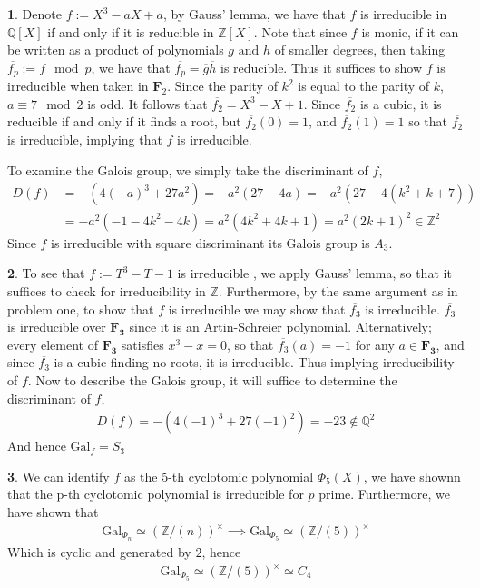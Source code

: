 \documentclass[11pt]{article}
\theoremstyle{definition}
\newtheorem{pb}{}
\newcommand{\tand}{\text{ and }}
\newcommand{\gal}{\text{Gal}}
\begin{document}
    \begin{pb}
        Denote \(f := X^3 -aX +a\), by Gauss' lemma, we have that \(f\) is irreducible in \(\mathbb{Q}[X]\) if and only if it is reducible in \(\mathbb{Z}[X]\). Note that since \(f\) is monic, if it can be written as a product of polynomials \(g \tand h\) of smaller degrees, then taking \(\overline{f_p} := f \mod{p}\), we have that \(\overline{f_p} = \overline{g}\overline{h}\) is reducible. Thus it suffices to show \(f\) is irreducible when taken in \(\mathbf{F}_2\). Since the parity of \(k^2\) is equal to the parity of \(k\), \(a \equiv 7 \mod{2}\) is odd. It follows that \(\overline{f_2} = X^3 - X + 1\). Since \(\overline{f_2}\) is a cubic, it is reducible if and only if it finds a root, but \(\overline{f_2}(0) = 1\), and \(\overline{f_2}(1) = 1\) so that \(\overline{f_2}\) is irreducible, implying that \(f\) is irreducible.
        
        To examine the Galois group, we simply take the discriminant of \(f\),
        \begin{align*}
            D(f) &= -(4(-a)^3 + 27a^2) = -a^2(27 - 4a) = -a^2(27-4(k^2+k+7)) \\
            &= -a^2(-1-4k^2-4k) = a^2(4k^2 + 4k + 1) = a^2(2k+1)^2 \in \mathbb{Z}^2
        \end{align*}
        Since \(f\) is irreducible with square discriminant its Galois group is \(A_3\).
    \end{pb}
    \begin{pb}
        To see that \(f := T^3 - T - 1\) is irreducible , we apply Gauss' lemma, so that it suffices to check for irreducibility in \(\mathbb{Z}\). Furthermore, by the same argument as in problem one, to show that \(f\) is irreducible we may show that \(\overline{f_3}\) is irreducible. \(\overline{f_3}\) is irreducible over \(\mathbf{F_3}\) since it is an Artin-Schreier polynomial. Alternatively; every element of \(\mathbf{F_3}\) satisfies \(x^3 - x = 0\), so that \(\overline{f_3}(a) = -1\) for any \(a \in \mathbf{F_3}\), and since \(\overline{f_3}\) is a cubic finding no roots, it is irreducible. Thus implying irreducibility of \(f\). Now to describe the Galois group, it will suffice to determine the discriminant of \(f\),
        \begin{align*}
            D(f) = -(4(-1)^3 + 27(-1)^2) = -23 \not \in \mathbb{\mathbb{Q}}^2
        \end{align*}
        And hence \(\gal_f = S_3\)
    \end{pb}
    \begin{pb}
        We can identify \(f\) as the 5-th cyclotomic polynomial \(\Phi_5(X)\), we have shownn that the p-th cyclotomic polynomial is irreducible for \(p\) prime. Furthermore, we have shown that
        \begin{align*}
            \gal_{\Phi_n} \simeq \left(\mathbb{Z}/(n)\right)^\times \implies \gal_{\Phi_5} \simeq \left(\mathbb{Z}/(5)\right)^\times
        \end{align*}
        Which is cyclic and generated by \(2\), hence
        \begin{align*}
            \gal_{\Phi_5} \simeq \left(\mathbb{Z}/(5)\right)^\times \simeq C_4
        \end{align*}
    \end{pb}
\end{document}
